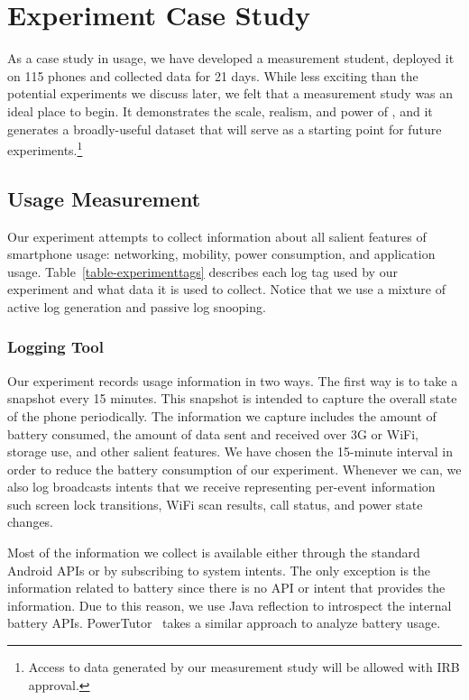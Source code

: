 \section{Experiment Case Study}
\label{sec-experiment}



As a case study in \PhoneLab{} usage, we have developed a measurement
student, deployed it on 115 phones and collected data for 21 days. While less
exciting than the potential experiments we discuss later, we felt that a
measurement study was an ideal place to begin. It demonstrates the scale,
realism, and power of \PhoneLab{}, and it generates a broadly-useful dataset
that will serve as a starting point for future experiments.\footnote{Access
to data generated by our measurement study will be allowed with IRB
approval.}

\subsection{Usage Measurement}

Our experiment attempts to collect information about all salient features of
smartphone usage: networking, mobility, power consumption, and application
usage. Table~\ref{table-experimenttags} describes each log tag used by our
experiment and what data it is used to collect. Notice that we use a mixture
of active log generation and passive log snooping.

\subsubsection{Logging Tool}

Our experiment records usage information in two ways. The first way is to
take a snapshot every 15 minutes. This snapshot is intended to capture the
overall state of the phone periodically. The information we capture includes
the amount of battery consumed, the amount of data sent and received over 3G
or WiFi, storage use, and other salient features. We have chosen the
15-minute interval in order to reduce the battery consumption of our
experiment. Whenever we can, we also log broadcasts intents that we receive
representing per-event information such screen lock transitions, WiFi scan
results, call status, and power state changes.

Most of the information we collect is available either through the standard
Android APIs or by subscribing to system intents. The only exception is the
information related to battery since there is no API or intent that provides
the information. Due to this reason, we use Java reflection to introspect the
internal battery APIs. PowerTutor~\cite{zhang:codes:2010} takes a similar
approach to analyze battery usage.

